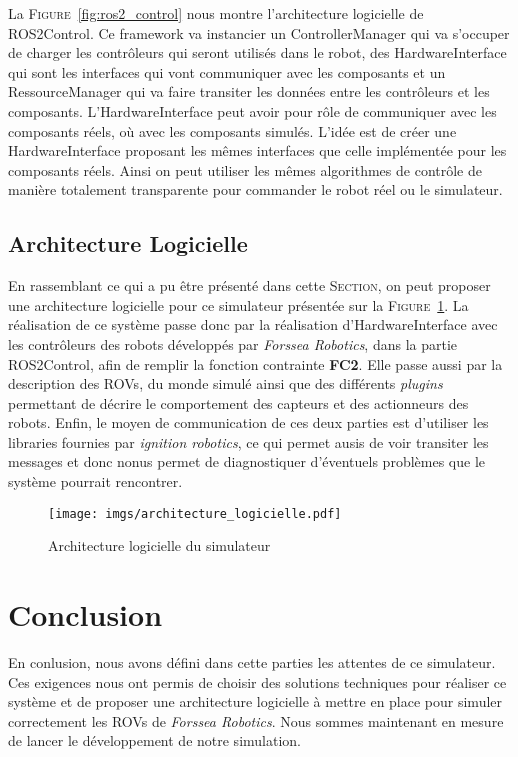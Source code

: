             La \textsc{Figure}~\ref{fig:ros2_control} nous montre l'architecture logicielle de \gls{ROS2Control}. Ce framework va instancier un \gls{ControllerManager} qui va s'occuper de charger les contrôleurs qui seront utilisés dans le robot, des \gls{HardwareInterface} qui sont les interfaces qui vont communiquer avec les composants et un \gls{RessourceManager} qui va faire transiter les données entre les contrôleurs et les composants. L'\gls{HardwareInterface} peut avoir pour rôle de communiquer avec les composants réels, où avec les composants simulés. L'idée est de créer une \gls{HardwareInterface} proposant les mêmes interfaces que celle implémentée pour les composants réels. Ainsi on peut utiliser les mêmes algorithmes de contrôle de manière totalement transparente pour commander le robot réel ou le simulateur.

        \subsection{Architecture Logicielle}

            En rassemblant ce qui a pu être présenté dans cette \textsc{Section}, on peut proposer une architecture logicielle pour ce simulateur présentée sur la \textsc{Figure}~\ref{fig:architecture_logicielle}. La réalisation de ce système passe donc par la réalisation d'\gls{HardwareInterface} avec les contrôleurs des robots développés par \textit{Forssea Robotics}, dans la partie \gls{ROS2Control}, afin de remplir la fonction contrainte \textbf{FC2}. Elle passe aussi par la description des \gls{ROV}s, du monde simulé ainsi que des différents \textit{plugins} permettant de décrire le comportement des capteurs et des actionneurs des robots. Enfin, le moyen de communication de ces deux parties est d'utiliser les libraries fournies par \textit{ignition robotics}, ce qui permet ausis de voir transiter les messages et donc nonus permet de diagnostiquer d'éventuels problèmes que le système pourrait rencontrer.
            
            \begin{figure}[!htb]
                \centering
                \texttt{[image: imgs/architecture\_logicielle.pdf]}
                \caption{Architecture logicielle du simulateur}
                \label{fig:architecture_logicielle}
            \end{figure}

    \section{Conclusion}

        En conlusion, nous avons défini dans cette parties les attentes de ce simulateur. Ces exigences nous ont permis de choisir des solutions techniques pour réaliser ce système et de proposer une architecture logicielle à mettre en place pour simuler correctement les \gls{ROV}s de \textit{Forssea Robotics}. Nous sommes maintenant en mesure de lancer le développement de notre simulation.
